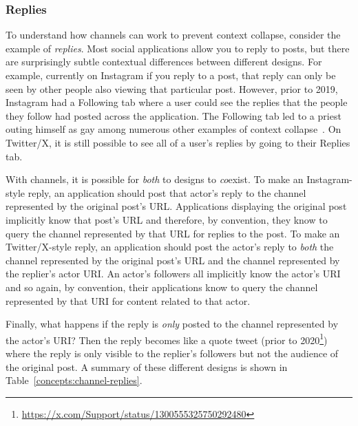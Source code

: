 
\subsubsection{Replies}

To understand how channels can work to prevent context collapse, consider the example of \emph{replies}.
Most social applications allow you to reply to posts, but there are surprisingly subtle
contextual differences between different designs.
For example, currently on Instagram
if you reply to a post, that reply can only be seen by other
people also viewing that particular post.
However, prior to 2019, Instagram had a Following tab where a user could see
the replies that the people they follow had posted across the application.
The Following tab led to a priest outing himself as gay among numerous other
examples of context collapse~\cite{instagramfollowingtab}.
On Twitter/X, it is still possible to see all of a user's replies by going
to their Replies tab.

With channels, it is possible for \emph{both} to designs to \emph{co}exist.
To make an Instagram-style reply,
an application should post that actor's reply to the channel
represented by the original post's URL.
Applications displaying the original post implicitly know that post's
URL and therefore,
by convention, they know to query the channel represented by that URL
for replies to the post.
To make an Twitter/X-style reply, an application should post the
actor's reply to \emph{both} the channel represented by the original post's URL
and the channel represented by the replier's actor URI.
An actor's followers all implicitly know the actor's URI and so
again, by convention, their applications know to query the channel represented by that URI
for content related to that actor.

Finally, what happens if the reply is \emph{only} posted to the
channel represented by the actor's URI?
Then the reply becomes like a quote tweet
(prior to 2020\footnote{
    \url{https://x.com/Support/status/1300555325750292480}
})
where the reply is only visible to the replier's followers but
not the audience of the original post.
A summary of these different designs is shown in Table~\ref{concepts:channel-replies}.

